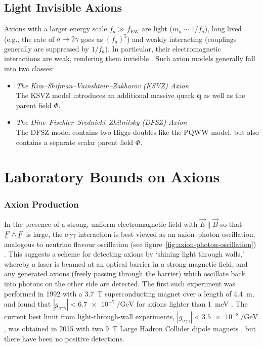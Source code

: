 \subsection{Light Invisible Axions}

Axions with a larger energy scale $f_a \gg f_\text{EW}$ are light ($m_a \sim 1/f_a$), long lived (e.g., the rate of $a \to 2γ$ goes as $(f_a)^5$) and weakly interacting (couplings generally are suppressed by $1/f_a$).
In particular, their electromagnetic interactions are weak, rendering them invisible \cite{Peccei_1996,Marsh_2016}.
Such axion models generally fall into two classes:
\begin{itemize}
	\item \textit{The Kim--Shifman--Vainshtein--Zakharov (KSVZ) Axion} \\
	The KSVZ model introduces an additional massive quark $\bm q$ as well as the parent field $Φ$.
	\item \textit{The Dine--Fischler--Srednicki--Zhitnitsky (DFSZ) Axion} \\
	The DFSZ model contains two Higgs doubles like the PQWW model, but also contains a separate scalar parent field $Φ$.
\end{itemize}


\section{Laboratory Bounds on Axions}

\subsubsection{Axion Production}
In the presence of a strong, uniform electromagnetic field with $\vec E \parallel \vec B$ so that $\ts F\wedge\ts F$ is large, the $aγγ$ interaction is best viewed as an axion--photon oscillation, analogous to neutrino flavour oscillation (see figure~\ref{fig:axion-photon-oscillation}) \cite[§\,91.3.1]{ParticleDataGroup-review-2020}.
This suggests a scheme for detecting axions by `shining light through walls,' whereby a laser is beamed at an optical barrier in a strong magnetic field, and any generated axions (freely passing through the barrier) which oscillate back into photons on the other side are detected.
The first such experiment was performed in 1992 with a \SI{3.7}{\tesla} superconducting magnet over a length of \SI{4.4}{\meter}, and found that $|g_{aγγ}| < \SI{6.7e-7}{\per\giga\eV}$ for axions lighter than \SI{1}{\milli\eV} \cite{first-LSW-experiment}.
The current best limit from light-through-wall experiments, $|g_{aγγ}| < \SI{3.5e-8}{\per\giga\eV}$, was obtained in 2015 with two \SI{9}{\tesla} Large Hadron Collider dipole magnets \cite{best-LSW-experiment}, but there have been no positive detections.


